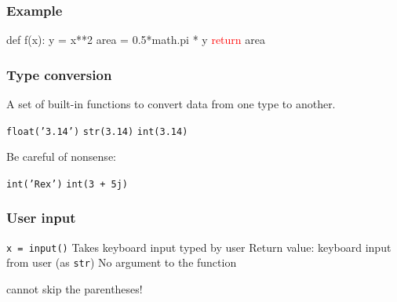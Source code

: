 \documentclass[11pt]{beamer}
\begin{document}
\begin{frame}[fragile]
  \frametitle{Example}
  \Enlarge

 
  \begin{semiverbatim} 
def f(x):
    y = x**2
    area = 0.5*math.pi * y
    \textcolor{red}{return} \textcolor{CS101PureBase}{area}
  \end{semiverbatim}

\end{frame}

\begin{frame}
  \frametitle{Type conversion}
  \Enlarge

  \begin{itemize}
  \myitem  A set of built-in functions to convert data from one type to another. \pause
    \begin{itemize}
    \mysubitem  \texttt{float('3.14')} 
    \mysubitem  \texttt{str(3.14)}
    \mysubitem  \texttt{int(3.14)} 
    \end{itemize} \pause
  \myitem  Be careful of nonsense:
    \begin{itemize}
    \mysubitem  \texttt{int('Rex')}
    \mysubitem  \texttt{int(3 + 5j)}
    \end{itemize}
  \end{itemize}
\end{frame}

\begin{frame}
  \frametitle{User input}
  \Enlarge

  \begin{itemize}
  \myitem  \texttt{x = input()} \pause
  \myitem  Takes keyboard input typed by user \pause
  \myitem  Return value:  keyboard input from user (as \texttt{str})
  \myitem  No argument to the function \pause
  \begin{itemize}
  	\mysubitem \textcolor{CS101GradBot}{cannot skip the parentheses! }
  \end{itemize}
  \end{itemize}
\end{frame}

\end{document}
